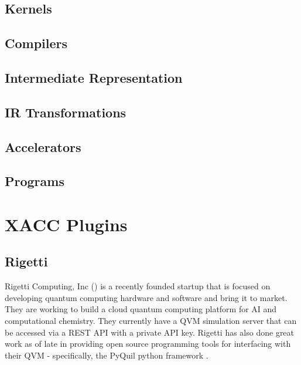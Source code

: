 \documentclass[letterpaper,10pt,english]{sphinxmanual}
\begin{document}
\section{Kernels}
\label{\detokenize{api:kernels}}

\section{Compilers}
\label{\detokenize{api:compilers}}

\section{Intermediate Representation}
\label{\detokenize{api:intermediate-representation}}

\section{IR Transformations}
\label{\detokenize{api:ir-transformations}}

\section{Accelerators}
\label{\detokenize{api:accelerators}}

\section{Programs}
\label{\detokenize{api:programs}}

\chapter{XACC Plugins}
\label{\detokenize{plugins:xacc-plugins}}\label{\detokenize{plugins::doc}}

\section{Rigetti}
\label{\detokenize{plugins:rigetti}}
Rigetti Computing, Inc () is a recently founded startup that is focused on
developing quantum computing hardware and software and bring it to market.
They are working to build a cloud quantum computing platform for AI and
computational chemistry. They currently have a QVM simulation server
that can be accessed via a REST API with a private API key. Rigetti has
also done great work as of late in providing open source programming tools for
interfacing with their QVM - specifically, the PyQuil python framework
.
\end{document}
